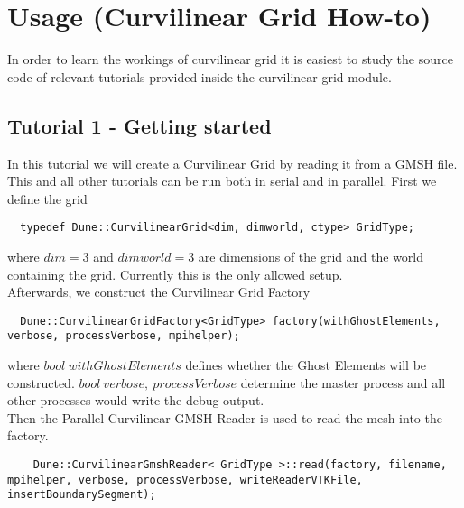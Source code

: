 \section{Usage (Curvilinear Grid How-to)}
In order to learn the workings of curvilinear grid it is easiest to study the source code of relevant tutorials  provided inside the curvilinear grid module.

\subsection{Tutorial 1 - Getting started}

In this tutorial we will create a Curvilinear Grid by reading it from a GMSH file. This and all other tutorials can be run both in serial and in parallel.
First we define the grid \\

\begin{mybox}
\begin{lstlisting}
  typedef Dune::CurvilinearGrid<dim, dimworld, ctype> GridType;
\end{lstlisting}
\end{mybox}

\noindent
where $dim=3$ and $dimworld=3$ are dimensions of the grid and the world containing the grid. Currently this is the only allowed setup. \\

\noindent
Afterwards, we construct the Curvilinear Grid Factory \\

\begin{mybox}
\begin{lstlisting}
  Dune::CurvilinearGridFactory<GridType> factory(withGhostElements, verbose, processVerbose, mpihelper);
\end{lstlisting}
\end{mybox}

\noindent
where $bool\ withGhostElements$ defines whether the Ghost Elements will be constructed. $bool\ verbose,\ processVerbose$ determine the master process and all other processes would write the debug output. \\

\noindent
Then the Parallel Curvilinear GMSH Reader is used to read the mesh into the factory. \\

\begin{mybox}
\begin{lstlisting}
    Dune::CurvilinearGmshReader< GridType >::read(factory, filename, mpihelper, verbose, processVerbose, writeReaderVTKFile, insertBoundarySegment); 
\end{lstlisting}
\end{mybox}

